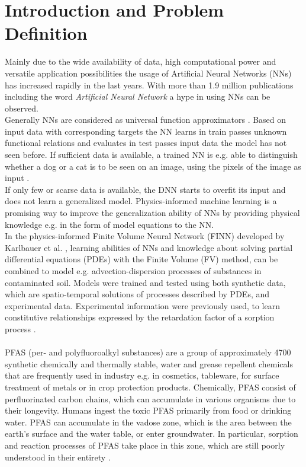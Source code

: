 \chapter{Introduction and Problem Definition}
Mainly due to the wide availability of data, high computational power and versatile application possibilities the usage of Artificial Neural Networks (NNs) has increased rapidly in the last years. With more than 1.9 million publications \cite{NumberDNN} including the word \textit{Artificial Neural Network} a hype in using NNs can be observed.\\
Generally NNs are considered as universal function approximators \cite{Cybenko1989Dec}. Based on input data with corresponding targets the NN learns in train passes unknown functional relations and evaluates in test passes input data the model has not seen before. If sufficient data is available, a trained NN is e.g. able to distinguish whether a dog or a cat is to be seen on an image, using the pixels of the image as input \cite{Team2021Aug}.\\
If only few or scarse data is available, the DNN starts to overfit its input and does not learn a generalized model. Physics-informed machine learning \cite{Raissi2017Nov} is a promising way to improve the generalization ability of NNs by providing physical knowledge e.g. in the form of model equations to the NN.\\
In the physics-informed Finite Volume Neural Network (FINN) developed by Karlbauer et al. \cite{karlbauer2021composing}, learning abilities of NNs and knowledge about solving partial differential equations (PDEs) with the Finite Volume (FV) method, can be combined to model e.g. advection-dispersion processes of substances in contaminated soil. Models were trained and tested using both synthetic data, which are spatio-temporal solutions of processes described by PDEs, and experimental data. Experimental information were previously used, to learn constitutive relationships expressed by the retardation factor of a sorption process \cite{Praditia2021Apr}.\\
\\
PFAS (per- and polyfluoroalkyl substances) are a group of approximately 4700 synthetic chemically and thermally stable, water and grease repellent chemicals that are frequently used in industry e.g. in cosmetics, tableware, for surface treatment of metals or in crop protection products. Chemically, PFAS consist of perfluorinated carbon chains, which can accumulate in various organisms due to their longevity. Humans ingest the toxic PFAS primarily from food or drinking water. PFAS can accumulate in the vadose zone, which is the area between the earth's surface and the water table, or enter groundwater. In particular, sorption and reaction processes of PFAS take place in this zone, which are still poorly understood in their entirety \cite{Gellrich2012May, Guo2020Feb}.\\
